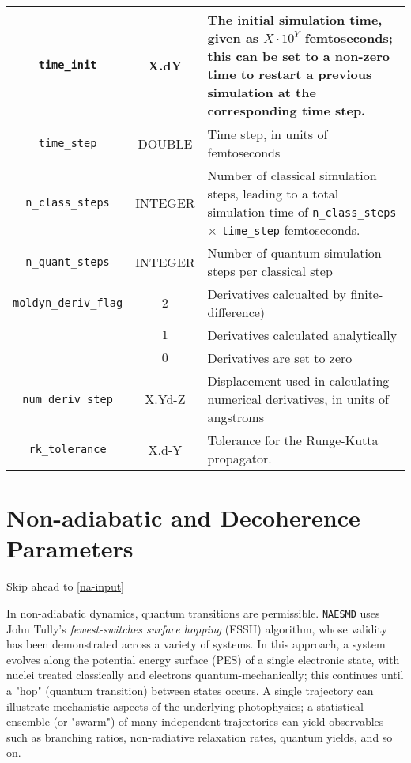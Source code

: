 \documentclass[12pt,letter,footinclude=true,headinclude=true,hyphens]{book} %
\begin{document}
    \begin{tabular}{ | c | c | p{7cm} | }
    \hline
    \texttt{time\_init} & X.dY & The initial simulation time, given as $X \cdot 10^Y$ femtoseconds; this can be set to a non-zero time to restart a previous simulation at the corresponding time step. \\ \hline
    \texttt{time\_step} & DOUBLE & Time step, in units of femtoseconds \\ \hline
    \texttt{n\_class\_steps} & INTEGER & Number of classical simulation steps, leading to a total simulation time of \texttt{n\_class\_steps} $\times$ \texttt{time\_step} femtoseconds. \\ \hline
    \texttt{n\_quant\_steps} & INTEGER & Number of quantum simulation steps per classical step \\ \hline
    \texttt{moldyn\_deriv\_flag} & $2$ & Derivatives calcualted by finite-difference) \\
    & $1$ &Derivatives calculated analytically \\
    & $0$ &Derivatives are set to zero \\ \hline
    \texttt{num\_deriv\_step} & X.Yd-Z & Displacement used in calculating numerical derivatives, in units of angstroms \\ \hline
    \texttt{rk\_tolerance} & X.d-Y & Tolerance for the Runge-Kutta propagator. \\
    \hline
    \end{tabular}
    
    \section{Non-adiabatic and Decoherence Parameters}
    
    Skip ahead to \ref{na-input}
    
    In non-adiabatic dynamics, quantum transitions are permissible. \texttt{NAESMD} uses John Tully's \emph{fewest-switches surface hopping} (FSSH) algorithm, whose validity has been demonstrated across a variety of systems. In this approach, a system evolves along the potential energy surface (PES) of a single electronic state, with nuclei treated classically and electrons quantum-mechanically; this continues until a "hop" (quantum transition) between states occurs. A single trajectory can illustrate mechanistic aspects of the underlying photophysics; a statistical ensemble (or "swarm") of many independent trajectories can yield observables such as branching ratios, non-radiative relaxation rates, quantum yields, and so on.
    
\end{document}
